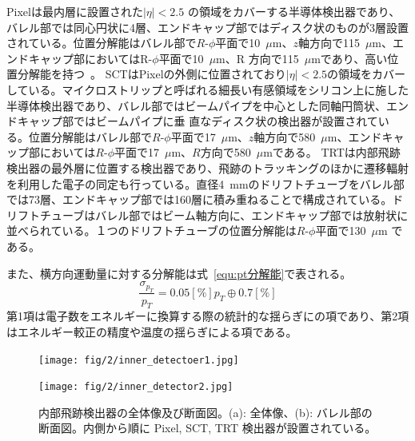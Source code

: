 Pixelは最内層に設置された$|\eta| < 2.5$ の領域をカバーする半導体検出器であり、バレル部では同心円状に4層、エンドキャップ部ではディスク状のものが3層設置されている。位置分解能はバレル部で$R$-$\phi$平面で10~$\mu$m、$z$軸方向で115~$\mu$m、エンドキャップ部においてはR-$\phi$平面で10~$\mu$m、R 方向で115~$\mu$mであり、高い位置分解能を持つ~\cite{Aad:1129811}。
SCTはPixelの外側に位置されており$|\eta| < 2.5$の領域をカバーしている。マイクロストリップと呼ばれる細長い有感領域をシリコン上に施した半導体検出器であり、バレル部ではビームパイプを中心とした同軸円筒状、エンドキャップ部ではビームパイプに垂
直なディスク状の検出器が設置されている。位置分解能はバレル部で$R$-$\phi$平面で17~$\mu$m、$z$軸方向で580~$\mu$m、エンドキャップ部においては$R$-$\phi$平面で17~$\mu$m、$R$方向で580~$\mu$mである\cite{Aad:1129811}。
TRTは内部飛跡検出器の最外層に位置する検出器であり、飛跡のトラッキングのほかに遷移輻射を利用した電子の同定も行っている。直径4~mmのドリフトチューブをバレル部では73層、エンドキャップ部では160層に積み重ねることで構成されている。ドリフトチューブはバレル部ではビーム軸方向に、エンドキャップ部では放射状に並べられている。１つのドリフトチューブの位置分解能は$R$-$\phi$平面で130~$\mu$m である。

また、横方向運動量に対する分解能は式~\ref{equ:pt分解能}で表される。
\begin{equation}
    \frac{\sigma_{p_{T}}}{p_{T}} = 0.05[\%]p_{T}\oplus 0.7 [\%]
　\label{equ:pt分解能}
\end{equation}
第1項は電子数をエネルギーに換算する際の統計的な揺らぎにの項であり、第2項はエネルギー較正の精度や温度の揺らぎによる項である。

\begin{figure}
    \centering
    \begin{minipage}[b]{0.4\linewidth}
        \centering
        \texttt{[image: fig/2/inner\_detectoer1.jpg]}
        \vspace{10pt}
        \subcaption{}
        \label{fig:内部飛跡検出器の概略図1}
    \end{minipage}
    \hfill
    \begin{minipage}[b]{0.5\linewidth}
        \centering
        \texttt{[image: fig/2/inner\_detector2.jpg]}
        \vspace{10pt}
        \subcaption{}
        \label{fig:内部飛跡検出器の概略図2}
    \end{minipage}
    \caption{内部飛跡検出器の全体像及び断面図。(a): 全体像\cite{Aad:1129811}、(b): バレル部の断面図\cite{Collaboration:2723878}。内側から順に Pixel, SCT, TRT 検出器が設置されている。}
    \label{fig:内部飛跡検出器}
\end{figure}



